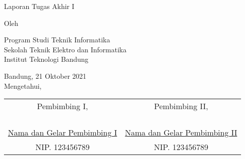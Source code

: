 \clearpage
\pagestyle{empty}

\begin{center}
    \smallskip

    \Large \bfseries \MakeUppercase{\thetitle}
    \vfill

    \Large Laporan Tugas Akhir I
    \vfill

    \large Oleh

    \Large \theauthor

    \large Program Studi Teknik Informatika \\

    \normalsize \normalfont
    Sekolah Teknik Elektro dan Informatika \\
    Institut Teknologi Bandung

    \vfill
    \normalsize \normalfont
    Bandung, 21 Oktober 2021 \\
    Mengetahui,

    \vspace{0.5cm}
    \setlength{\tabcolsep}{12pt}
    \begin{tabular}{c@{\hskip 0.5in}c}
        Pembimbing I,                           & Pembimbing II,                           \\
                                                &                                          \\
                                                &                                          \\
                                                &                                          \\
                                                &                                          \\
        \underline{Nama dan Gelar Pembimbing I} & \underline{Nama dan Gelar Pembimbing II} \\
        NIP. 123456789                          & NIP. 123456789                           \\
    \end{tabular}

\end{center}
\clearpage
